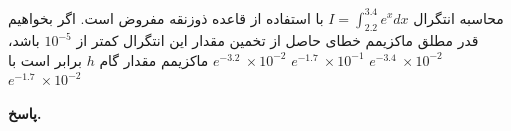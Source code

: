 محاسبه انتگرال 
\(I = \int_{2.2}^{3.4} e^x dx\)
با استفاده از قاعده ذوزنقه مفروض است. اگر بخواهیم قدر مطلق ماکزیمم خطای حاصل از تخمین مقدار این انتگرال کمتر از 
\(10^{-5}\)
باشد، ماکزیمم مقدار گام 
\(h\)
برابر است با
 \mulchoice
	{\(e^{-3.2}\ \times 10^{-2}\)}
	{\(e^{-1.7}\ \times 10^{-1}\)}
	{\(e^{-3.4}\ \times 10^{-2}\)}
	{\(e^{-1.7}\ \times 10^{-2}\)}

\begin{answer}

	\textbf{پاسخ.}
	
\end{answer}
